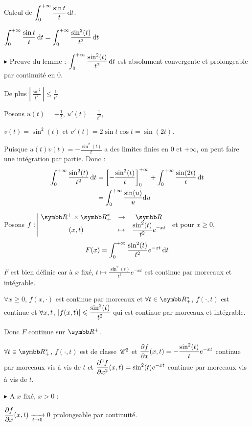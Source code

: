 \begin{exemple}
    Calcul de $\displaystyle \int_{0}^{+ \infty} \frac{\sin t}{t} \,\mathrm{d}t$.

     $\displaystyle \int_{0}^{+ \infty} \frac{\sin t }{t } \,\mathrm{d}t = \int_{0}^{+\infty} \frac{\sin^2(t)}{t^2} \,\mathrm{d}t$

    \avspace $\blacktriangleright$ Preuve du lemme : $\displaystyle \int_{0}^{+\infty} \frac{\sin^2(t)}{t^2} \,\mathrm{d}t $ est 
    absolument convergente  et prolongeable par continuité en $0$. 
    
    De plus $\left| \frac{\sin^2}{t^2} \right| \leqslant \frac 1 {t^2}$

    Posons $u(t) = - \frac 1 t$, $u'(t) = \frac 1 {t^2}$, 

    $v(t) = \sin^2(t)$ et $v'(t) = 2 \sin t \cos t = \sin(2t)$.

    Puisque $u(t)v(t) = - \frac{\sin^2(t)}{t}$ a des limites finies en $0$ et $+\infty$, on peut faire une intégration par partie. Donc : 
    \begin{align}
        \int_0^{+ \infty} \frac{\sin^2(t)}{t^2} \,\mathrm{d}t & = \left[ -\frac{\sin^2(t)}{t} \right]_0^{+ \infty} + \int_0^{+ \infty} \frac{\sin(2t)}{t} \,\mathrm{d}t \\
        & = \int_0^{+ \infty} \frac{\sin(u)}{u} \mathrm d u
    \end{align}

    Posons $\fonction f {\R^+ \times \R^*_+} \R {(x, t)}{\frac{\sin^2(t)}{t^2}e^{-xt}}$ et pour $x \geqslant 0$, 
    $$F(x) = \int_0^{+ \infty} \frac{\sin^2(t)}{t^2} e^{-xt} \,\mathrm{d}t$$

    $F$ est bien définie car à $x$ fixé, $t \mapsto \frac{\sin^2(t)}{t^2} e^{-xt}$ est continue par morceaux et intégrable.

    $\forall x \geqslant 0$, $f(x, \cdot)$ est continue par morceaux et $\forall t \in \R_+^*$, $f(\cdot, t)$ est continue et 
    $\displaystyle \forall x, t$, $\displaystyle |f(x, t)| \leqslant \frac{\sin^2(t)}{t^2}$ qui est continue par morceaux et intégrable. 

    Donc $F$ continue sur $\R^+$. 

    $\forall t \in \R^*_+$, $f(\cdot, t)$ est de classe $\,\mathscr C^{2}$ et 
    $\displaystyle \frac{\partial f}{\partial x} (x, t) = - \frac{\sin^2(t)}{t}e^{-xt}$ continue par morceaux vis à vis de $t$ et 
    $\displaystyle \frac{\partial^{2} f}{\partial x^{2}}(x, t) = \sin^2(t) e^{-xt}$ continue par morceaux vis à vis de $t$.

    \avspace $\blacktriangleright$ A $x$ fixé, $x > 0$ : 

    $\displaystyle \frac{\partial f}{\partial x} (x, t) \xrightarrow[t \to 0 ]{} 0$ prolongeable par continuité. 


\end{exemple}
